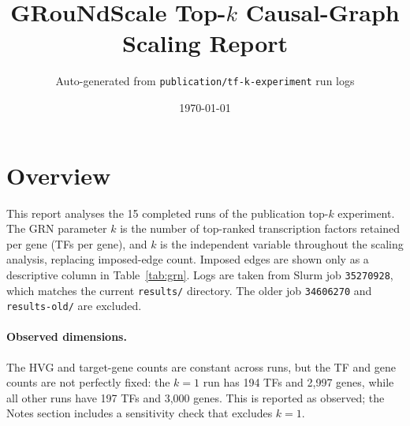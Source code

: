 \documentclass[11pt]{article}
\title{GRouNdScale Top-$k$ Causal-Graph Scaling Report}
\author{Auto-generated from \texttt{publication/tf-k-experiment} run logs}
\date{\today}
\begin{document}
\maketitle
\section{Overview}
This report analyses the 15 completed runs of the publication top-$k$ experiment. The GRN parameter $k$ is the number of top-ranked transcription factors retained per gene (TFs per gene), and $k$ is the independent variable throughout the scaling analysis, replacing imposed-edge count. Imposed edges are shown only as a descriptive column in Table~\ref{tab:grn}.
Logs are taken from Slurm job \texttt{35270928}, which matches the current \texttt{results/} directory. The older job \texttt{34606270} and \texttt{results-old/} are excluded.
\paragraph{Observed dimensions.} The HVG and target-gene counts are constant across runs, but the TF and gene counts are not perfectly fixed: the $k=1$ run has 194 TFs and 2,997 genes, while all other runs have 197 TFs and 3,000 genes. This is reported as observed; the Notes section includes a sensitivity check that excludes $k=1$.
\end{document}
